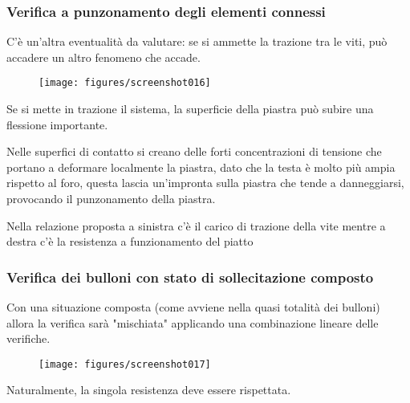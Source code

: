 \documentclass[a4paper, 15pt]{article}
\begin{document}
\subsubsection{Verifica a punzonamento degli elementi connessi}
\begin{adjustwidth}{2in}{}	
	C'è un'altra eventualità da valutare: se si ammette la trazione tra le viti, può accadere un altro fenomeno che accade. 
	\begin{figure}[H]
		\centering
		\texttt{[image: figures/screenshot016]}
		\label{fig:screenshot016}
	\end{figure}
	Se si mette in trazione il sistema, la superficie della piastra può subire una flessione importante. 
	
	Nelle superfici di contatto si creano delle forti concentrazioni di tensione che portano a deformare localmente la piastra, dato che la testa è molto più ampia rispetto al foro, questa lascia un'impronta sulla piastra che tende a danneggiarsi, provocando il punzonamento della piastra. 
	
	Nella relazione proposta a sinistra c'è il carico di trazione della vite mentre a destra c'è la resistenza a funzionamento del piatto 
\end{adjustwidth}
\newpage
\subsubsection{Verifica dei bulloni con stato di sollecitazione composto}
\begin{adjustwidth}{2in}{}	
	Con una situazione composta (come avviene nella quasi totalità dei bulloni) allora la verifica sarà "mischiata" applicando una combinazione lineare delle verifiche. 
		\begin{figure}[H]
			\centering
			\texttt{[image: figures/screenshot017]}
			\label{fig:screenshot017}
		\end{figure}
		Naturalmente, la singola resistenza deve essere rispettata. 
\end{adjustwidth}
\end{document}
